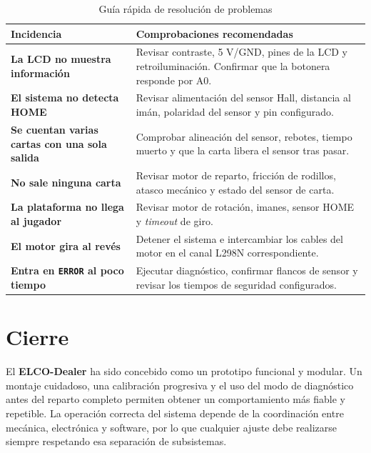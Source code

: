 \documentclass[a4paper, 11pt]{article}
\begin{document}
\begin{table}[H]
\centering
\small
\begin{tabularx}{\textwidth}{>{\bfseries}p{}X}
\hline
\textbf{Incidencia} & \textbf{Comprobaciones recomendadas} \\
\hline
La LCD no muestra información & Revisar contraste, 5 V/GND, pines de la LCD y retroiluminación. Confirmar que la botonera responde por A0. \\
El sistema no detecta HOME & Revisar alimentación del sensor Hall, distancia al imán, polaridad del sensor y pin configurado. \\
Se cuentan varias cartas con una sola salida & Comprobar alineación del sensor, rebotes, tiempo muerto y que la carta libera el sensor tras pasar. \\
No sale ninguna carta & Revisar motor de reparto, fricción de rodillos, atasco mecánico y estado del sensor de carta. \\
La plataforma no llega al jugador & Revisar motor de rotación, imanes, sensor HOME y \textit{timeout} de giro. \\
El motor gira al revés & Detener el sistema e intercambiar los cables del motor en el canal L298N correspondiente. \\
Entra en \texttt{ERROR} al poco tiempo & Ejecutar diagnóstico, confirmar flancos de sensor y revisar los tiempos de seguridad configurados. \\
\hline
\end{tabularx}
\caption{Guía rápida de resolución de problemas}
\label{tab:manual_troubleshooting}
\end{table}

\section{Cierre}

El \textbf{ELCO-Dealer} ha sido concebido como un prototipo funcional y modular. Un montaje cuidadoso, una calibración progresiva y el uso del modo de diagnóstico antes del reparto completo permiten obtener un comportamiento más fiable y repetible. La operación correcta del sistema depende de la coordinación entre mecánica, electrónica y software, por lo que cualquier ajuste debe realizarse siempre respetando esa separación de subsistemas.
\end{document}
